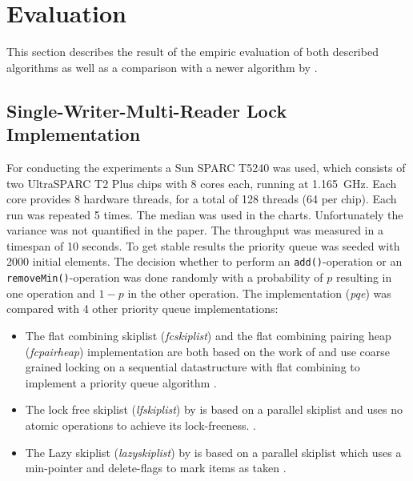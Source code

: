 
\section{Evaluation}

This section describes the result of the empiric evaluation of both described algorithms as well as a comparison with a newer algorithm by \citeauthor{braginsky_cbpq:_2016}.

\subsection{Single-Writer-Multi-Reader Lock Implementation}

For conducting the experiments a Sun SPARC T5240 was used, which consists of two UltraSPARC T2 Plus chips with 8 cores each, running at 1.165~GHz. Each core provides 8 hardware threads, for a total of 128 threads (64 per chip). Each run was repeated 5 times. The median was used in the charts. Unfortunately the variance was not quantified in the paper. The throughput was measured in a timespan of 10 seconds. To get stable results the priority queue was seeded with 2000 initial elements. The decision whether to perform an \texttt{add()}-operation or an \texttt{removeMin()}-operation was done randomly with a probability of $p$ resulting in one operation and $1-p$ in the other operation.
\newpage
The implementation (\textit{pqe}) was compared with 4 other priority queue implementations:
\begin{itemize}
	\item The flat combining skiplist (\textit{fcskiplist}) and the flat combining pairing heap (\textit{fcpairheap}) implementation are both based on the work of \citeauthor{hendler_flat_2010} and use coarse grained locking on a sequential datastructure with flat combining to implement a priority queue algorithm \cite{hendler_flat_2010}.
	\item The lock free skiplist (\textit{lfskiplist}) by \citeauthor{sundell_fast_2003} is based on a parallel skiplist and uses no atomic operations to achieve its lock-freeness. \cite{sundell_fast_2003}.
	\item The Lazy skiplist (\textit{lazyskiplist}) by \citeauthor{lotan_skiplist-based_2000} is based on a parallel skiplist which uses a min-pointer and delete-flags to mark items as taken \cite{lotan_skiplist-based_2000}.
\end{itemize}

